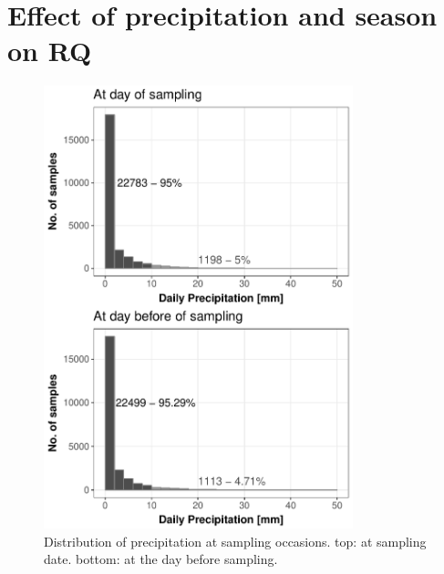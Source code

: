 \clearpage
\section{Effect of precipitation and season on RQ}

\begin{figure}[H]
	\centering
	\includegraphics[width = 0.8\textwidth]{appendix/smallstreams/one/precip}
	\caption[Distribution of precipitation at sampling occasions.]{Distribution of precipitation at sampling occasions. top: at sampling date. bottom: at the day before sampling.}
	\label{fig:precip}
\end{figure}

% 
\clearpage

\clearpage


